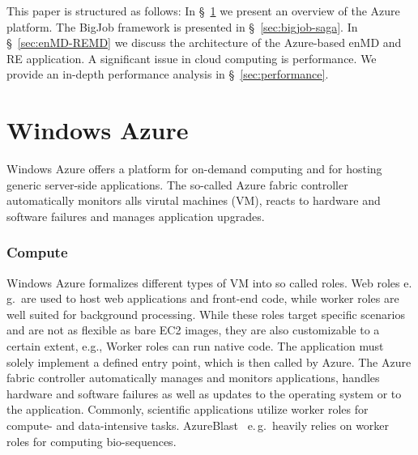 \documentclass[conference,final]{IEEEtran}
\newcommand{\up}{\vspace*{-1em}}
\newcommand{\alnote}[1]{ {\textcolor{blue} { ***AL: #1 }}}
\newcommand{\jhanote}[1]{ {\textcolor{red} { ***SJ: #1 }}}
\newcommand{\alnote}[1]{}
\newcommand{\jhanote}[1]{}
\begin{document}
This paper is structured as follows: In \S~\ref{sec:azure} we present
an overview of the Azure platform. The BigJob framework is presented
in \S~\ref{sec:bigjob-saga}. In \S~\ref{sec:enMD-REMD} we discuss the
architecture of the Azure-based enMD and RE application.  A
significant issue in cloud computing is performance. We provide an
in-depth performance analysis in \S~\ref{sec:performance}.



\up
\section{Windows Azure}
\label{sec:azure}
\up
Windows Azure offers a platform for on-demand computing and for
hosting generic server-side applications. The so-called Azure fabric
controller automatically monitors alls virutal machines (VM), reacts
to hardware and software failures and manages application upgrades.

\subsubsection{Compute}

Windows Azure formalizes different types of VM into so called
roles. Web roles e.\,g.\ are used to host web applications and
front-end code, while worker roles are well suited for background
processing. While these roles target specific scenarios and are not as
flexible as bare EC2 images, they are also customizable to a certain
extent, e.g., Worker roles can run native code. The application must
solely implement a defined entry point, which is then called by
Azure. The Azure fabric controller automatically manages and monitors
applications, handles hardware and software failures as well as
updates to the operating system or to the application.  Commonly,
scientific applications utilize worker roles for compute- and
data-intensive tasks. AzureBlast~\cite{azure_blast} e.\,g.\ heavily
relies on worker roles for computing bio-sequences.
\end{document}

